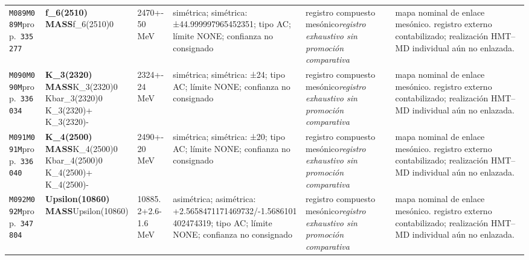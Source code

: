 \begin{landscape}
\begin{longtable}{L{1.85cm}L{4.45cm}L{2.35cm}L{4.05cm}L{3.35cm}L{7.15cm}}
\texttt{M089}\newline \texttt{M089M}\newline prop.\ \texttt{335277} & \textbf{f\_\allowbreak{}6(2510) MASS}\newline f\_\allowbreak{}6(2510)0 & 2470+-50\,MeV & simétrica; simétrica: ±44.999997965452351; tipo AC; límite NONE; confianza no consignado & registro compuesto mesónico\newline \emph{registro exhaustivo sin promoción comparativa} & mapa nominal de enlace mesónico. registro externo contabilizado; realización HMT--MD individual aún no enlazada. \\
\texttt{M090}\newline \texttt{M090M}\newline prop.\ \texttt{336034} & \textbf{K\_\allowbreak{}3(2320) MASS}\newline K\_\allowbreak{}3(2320)0 \textbar{}\allowbreak{} Kbar\_\allowbreak{}3(2320)0 \textbar{}\allowbreak{} K\_\allowbreak{}3(2320)+ \textbar{}\allowbreak{} K\_\allowbreak{}3(2320)- & 2324+-24\,MeV & simétrica; simétrica: ±24; tipo AC; límite NONE; confianza no consignado & registro compuesto mesónico\newline \emph{registro exhaustivo sin promoción comparativa} & mapa nominal de enlace mesónico. registro externo contabilizado; realización HMT--MD individual aún no enlazada. \\
\texttt{M091}\newline \texttt{M091M}\newline prop.\ \texttt{336040} & \textbf{K\_\allowbreak{}4(2500) MASS}\newline K\_\allowbreak{}4(2500)0 \textbar{}\allowbreak{} Kbar\_\allowbreak{}4(2500)0 \textbar{}\allowbreak{} K\_\allowbreak{}4(2500)+ \textbar{}\allowbreak{} K\_\allowbreak{}4(2500)- & 2490+-20\,MeV & simétrica; simétrica: ±20; tipo AC; límite NONE; confianza no consignado & registro compuesto mesónico\newline \emph{registro exhaustivo sin promoción comparativa} & mapa nominal de enlace mesónico. registro externo contabilizado; realización HMT--MD individual aún no enlazada. \\
\texttt{M092}\newline \texttt{M092M}\newline prop.\ \texttt{347804} & \textbf{Upsilon(10860) MASS}\newline Upsilon(10860) & 10885.2+2.6-1.6\,MeV & asimétrica; asimétrica: +2.5658471171469732/-1.5686101402474319; tipo AC; límite NONE; confianza no consignado & registro compuesto mesónico\newline \emph{registro exhaustivo sin promoción comparativa} & mapa nominal de enlace mesónico. registro externo contabilizado; realización HMT--MD individual aún no enlazada. \\

\end{longtable}
\end{landscape}
